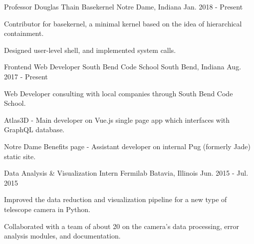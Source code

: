 \begin{cventries}
  \cventry
    {Professor Douglas Thain}
    {Basekernel}
    {Notre Dame, Indiana}
    {Jan. 2018 - Present}
    {
      \begin{cvitems}
        \item {Contributor for basekernel, a minimal kernel based on the idea of hierarchical containment.}
        \item {Designed user-level shell, and implemented system calls.}
        \item {\href{https://github.com/dthain/basekernel}{\faGithubSquare\acvHeaderIconSep\@Basekernel}}
      \end{cvitems}
    }
  \cventry
    {Frontend Web Developer}
    {South Bend Code School}
    {South Bend, Indiana}
    {Aug. 2017 - Present}
    {
      \begin{cvitems}
        \item {Web Developer consulting with local companies through South Bend Code School.}
        \item {Atlas3D - Main developer on Vue.js single page app which interfaces with GraphQL database.}
        \item {{Notre Dame Benefits page} - Assistant developer on internal Pug (formerly Jade) static site.\\}
      \end{cvitems}
    }
  \cventry
    {Data Analysis \& Visualization Intern}
    {Fermilab}
    {Batavia, Illinois}
    {Jun. 2015 - Jul. 2015}
    {
      \begin{cvitems}
        \item {Improved the data reduction and visualization pipeline for a new type
of telescope camera in Python.}
        \item {Collaborated with a team of about 20 on the camera’s data processing, error analysis modules, and documentation.}
      \end{cvitems}
    }
\end{cventries}
\iffalse
  \cventry
    {Donation Facilitator}
    {Notre Dame Alumni Center}
    {Notre Dame, Indiana}
    {Sep. 2016 - May. 2017}
    {
      \begin{cvitems}
        \item {Facilitated financial contributions to the University for various causes and campaigns.}
        \item {Exceeded the average amount of donations by more than 17\% in every report.}
      \end{cvitems}
    }
\fi
